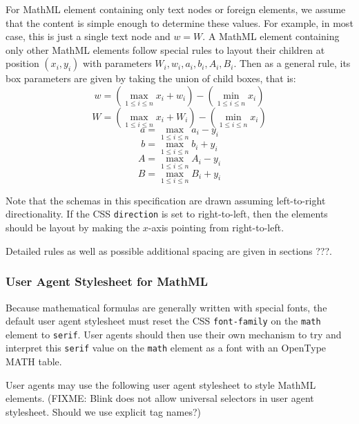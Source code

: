 \begin{figure}
\centering
{}
\label{MathMLBoxModel}
\end{figure}

For MathML element containing only text nodes or foreign elements, we assume
that the content is simple enough to determine these values. For example,
in most case, this is just a single text node and $w = W$.
A MathML element containing only other MathML elements follow special rules to
layout their children at position $(x_i,y_i)$ with parameters
$W_i,w_i,a_i,b_i,A_i,B_i$. Then as a general rule, its box parameters are given
by taking the union of child boxes, that is:
%
$$w = \left(\max_{1 \leq i \leq n } {x_i + w_i}\right) -
      \left(\min_{1 \leq i \leq n} x_i\right)$$
$$W = \left(\max_{1 \leq i \leq n } {x_i + W_i}\right) -
      \left(\min_{1 \leq i \leq n} x_i\right)$$
$$a = \max_{1 \leq i \leq n } {a_i - y_i}$$
$$b = \max_{1 \leq i \leq n } {b_i + y_i}$$
$$A = \max_{1 \leq i \leq n } {A_i - y_i}$$
$$B = \max_{1 \leq i \leq n } {B_i + y_i}$$
%

Note that the schemas in this specification are drawn assuming left-to-right
directionality. If the CSS {\tt direction} is set to right-to-left, then the
elements should be layout by making the $x$-axis pointing from right-to-left.

Detailed rules as well as possible additional spacing are given in sections ???.

\subsubsection{User Agent Stylesheet for MathML}

Because mathematical formulas are generally written with special fonts, the
default user agent stylesheet must reset the CSS {\tt font-family} on the
{\tt math} element to {\tt serif}. User agents should then use their own
mechanism to try and interpret this {\tt serif} value on the {\tt math} element
as a font with an OpenType MATH table.

User agents may use the following user agent stylesheet to style MathML
elements. (FIXME: Blink does not allow universal selectors in user agent
stylesheet. Should we use explicit tag names?)


